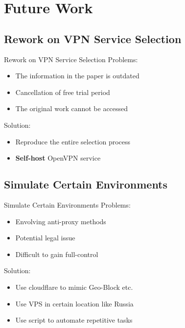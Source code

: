 \documentclass{beamer}
\begin{document}
\section{Future Work}

\subsection{Rework on VPN Service Selection}

\begin{frame}{Rework on VPN Service Selection}
  Problems:
  \begin{itemize}
    \item The information in the paper is outdated
    \item Cancellation of free trial period
    \item The original work cannot be accessed\footnotemark{}
  \end{itemize} \pause{}

  Solution:
  \begin{itemize}
    \item Reproduce the entire selection process
    \item \textbf{Self-host} OpenVPN service\footnotemark{}
  \end{itemize}

\end{frame}

\subsection{Simulate Certain Environments}

\begin{frame}{Simulate Certain Environments}
  Problems:
  \begin{itemize}
    \item Envolving anti-proxy methods\footnotemark{}
    \item Potential legal issue
    \item Difficult to gain full-control
  \end{itemize} \pause{}

  Solution:
  \begin{itemize}
    \item Use cloudflare to mimic Geo-Block etc.
    \item Use VPS in certain location like Russia
    \item Use script to automate repetitive tasks
  \end{itemize}

\end{frame}
\end{document}
